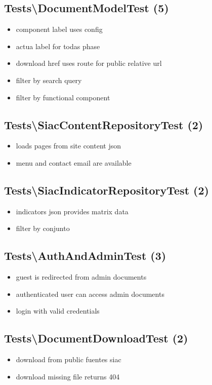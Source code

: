\subsection{Tests\Unit\textbackslash DocumentModelTest (5)}
\begin{itemize}
  \item component label uses config
  \item actua label for todas phase
  \item download href uses route for public relative url
  \item filter by search query
  \item filter by functional component
\end{itemize}

\subsection{Tests\Unit\textbackslash SiacContentRepositoryTest (2)}
\begin{itemize}
  \item loads pages from site content json
  \item menu and contact email are available
\end{itemize}

\subsection{Tests\Unit\textbackslash SiacIndicatorRepositoryTest (2)}
\begin{itemize}
  \item indicators json provides matrix data
  \item filter by conjunto
\end{itemize}

\subsection{Tests\Feature\textbackslash AuthAndAdminTest (3)}
\begin{itemize}
  \item guest is redirected from admin documents
  \item authenticated user can access admin documents
  \item login with valid credentials
\end{itemize}

\subsection{Tests\Feature\textbackslash DocumentDownloadTest (2)}
\begin{itemize}
  \item download from public fuentes siac
  \item download missing file returns 404
\end{itemize}

